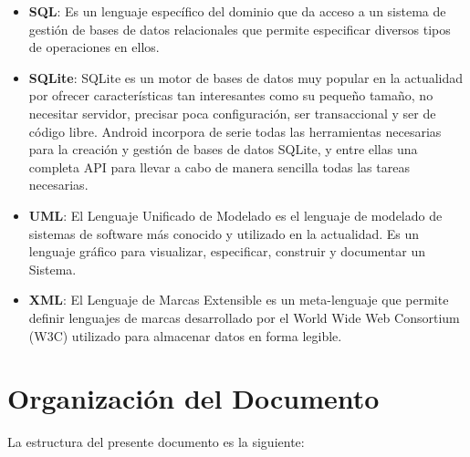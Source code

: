 \begin{itemize}
\item \textbf{SQL}: Es un lenguaje específico del dominio que da acceso a un sistema de gestión de bases de datos relacionales que permite especificar diversos tipos de operaciones en ellos.
\item \textbf{SQLite}: SQLite es un motor de bases de datos muy popular en la actualidad por ofrecer características tan interesantes como su pequeño tamaño, no necesitar servidor, precisar poca configuración, ser transaccional y ser de código libre. Android incorpora de serie todas las herramientas necesarias para la creación y gestión de bases de datos SQLite, y entre ellas una completa API para llevar a cabo de manera sencilla todas las tareas necesarias.
\item \textbf{UML}: El Lenguaje Unificado de Modelado es el lenguaje de modelado de sistemas de software más conocido y utilizado en la actualidad. Es un lenguaje gráfico para visualizar, especificar, construir y documentar un Sistema.
\item \textbf{XML}: El Lenguaje de Marcas Extensible es un meta-lenguaje que permite definir lenguajes de marcas desarrollado por el World Wide Web Consortium (W3C) utilizado para almacenar datos en forma legible.
\end{itemize}

\section{Organización del Documento}

La estructura del presente documento es la siguiente:

